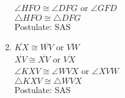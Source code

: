 \begin{enumerate}[label = \arabic*. ]
$\angle{HFO} \cong \angle{DFG}$ or $\angle{GFD}$ \redcheck \\
$\triangle{HFO} \cong \triangle{DFG}$ \redcheck \\
Postulate: SAS\redcheck
\item $\overline{KX} \cong \overline{WV}$ or $\overline{VW}$ \redcheck \\
$\overline{XV} \cong \overline{XV}$ or $\overline{VX}$ \redcheck \\
$\angle{KXV} \cong \angle{WVX}$ or $\angle{XVW}$ \redcheck \\
$\triangle{KXV} \cong \triangle{WVX}$ \redcheck \\
Postulate: SAS\redcheck

\end{enumerate}   


